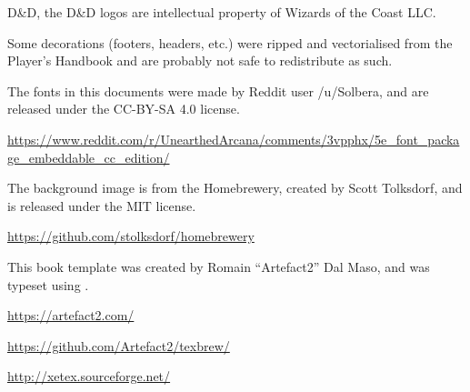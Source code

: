 \item D\&D, the D\&D logos are intellectual property of Wizards of the
  Coast LLC.

\item Some decorations (footers, headers, etc.) were ripped and
  vectorialised from the Player's Handbook and are probably not safe
  to redistribute as such.

\item The fonts in this documents were made by Reddit user /u/Solbera,
  and are released under the CC-BY-SA 4.0 license.

  \url{https://www.reddit.com/r/UnearthedArcana/comments/3vpphx/5e_font_package_embeddable_cc_edition/}

\item The background image is from the Homebrewery, created by Scott
  Tolksdorf, and is released under the MIT license.

  \url{https://github.com/stolksdorf/homebrewery}

\item This book template was created by Romain ``Artefact2'' Dal Maso,
  and was typeset using \XeTeX.

  \url{https://artefact2.com/}

  \url{https://github.com/Artefact2/texbrew/}
      
  \url{http://xetex.sourceforge.net/}
